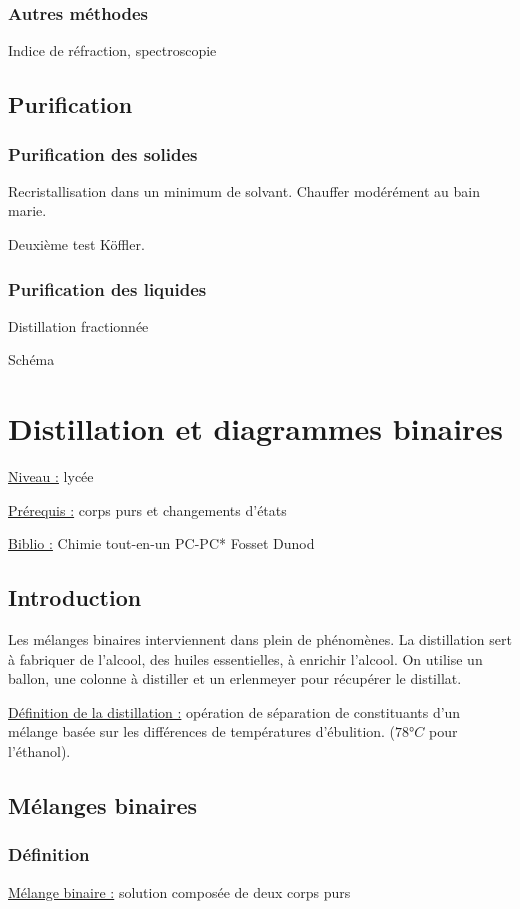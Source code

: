 \documentclass{article}%
\begin{document}
\subsubsection{Autres méthodes}
Indice de réfraction, spectroscopie

\subsection{Purification}
\subsubsection{Purification des solides}
Recristallisation dans un minimum de solvant. Chauffer modérément au bain marie.

Deuxième test Köffler.
\subsubsection{Purification des liquides}
Distillation fractionnée

Schéma
\section{Distillation et diagrammes binaires}
\underline{Niveau :} lycée

\underline{Prérequis :} corps purs et changements d'états

\underline{Biblio :} Chimie tout-en-un PC-PC* Fosset Dunod

\subsection{Introduction}

Les mélanges binaires interviennent dans plein de phénomènes. La distillation sert à fabriquer de l'alcool, des huiles essentielles, à enrichir l'alcool.
On utilise un ballon, une colonne à distiller et un erlenmeyer pour récupérer le distillat.

\underline{Définition de la distillation :} opération de séparation de constituants d'un mélange basée sur les différences de températures d'ébulition. ($78 °C$ pour l'éthanol).

\subsection{Mélanges binaires}
\subsubsection{Définition}
\underline{Mélange binaire :} solution composée de deux corps purs
\end{document}
